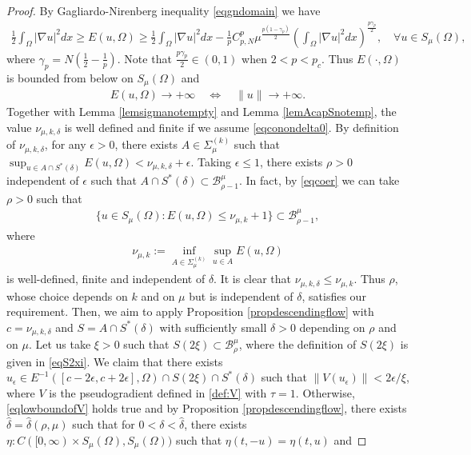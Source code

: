\documentclass[10pt,a4paper]{article}
\theoremstyle{definition} \theoremstyle{remark}
\numberwithin{equation}{section}
\newcommand{\B}{\mathcal{B}}
\newcommand{\ga}{\gamma}
\newcommand{\ep}{\epsilon}
\begin{document}
\begin{proof}
	By Gagliardo-Nirenberg inequality \eqref{eqgndomain} we have
	\begin{align} \label{eq5.3}
		\frac12 \int_\Omega |\nabla u|^2dx \ge E(u,\Omega) \geq \frac12 \int_\Omega |\nabla u|^2dx - \frac1p C_{p,N}^p \mu^{\frac{p(1-\ga_p)}{2}}\left( \int_\Omega |\nabla u|^2dx\right) ^{\frac{p\ga_p}{2}}, \quad \forall u \in S_\mu(\Omega),
	\end{align}
    where $\ga_p = N(\frac12-\frac1p)$. Note that $\frac{p\ga_p}{2} \in (0,1)$ when $2 < p < p_c$. Thus $E(\cdot, \Omega)$ is bounded from below on $S_\mu(\Omega)$ and
    \begin{align} \label{eqcoer}
    	E(u,\Omega) \to +\infty \quad \Leftrightarrow \quad \|u\| \to +\infty.
    \end{align}
    Together with Lemma \ref{lemsigmanotempty} and Lemma \ref{lemAcapSnotemp}, the value $\nu_{\mu,k,\delta}$ is well defined and finite if we assume \eqref{eqconondelta0}. By definition of $\nu_{\mu,k,\delta}$, for any $\ep > 0$, there exists $A \in \Sigma_{\mu}^{(k)}$ such that $\sup_{u \in A \cap S^*(\delta)}E(u,\Omega) < \nu_{\mu,k,\delta} + \ep$. Taking $\ep \leq 1$, there exists $\rho > 0$ independent of $\ep$ such that $A \cap S^*(\delta) \subset \B_{\rho-1}^\mu$. In fact, by \eqref{eqcoer} we can take $\rho > 0$ such that
    \begin{align*}
    	\bigl\{u \in S_\mu(\Omega) : E(u,\Omega) \leq \nu_{\mu,k} + 1\bigr\} \subset \B_{\rho-1}^\mu,
    \end{align*}
    where
    \begin{align}
    	\nu_{\mu,k} := \inf_{A \in \Sigma_{\mu}^{(k)}}\sup_{u \in A}E(u,\Omega)
    \end{align}
    is well-defined, finite and independent of $\delta$. It is clear that $\nu_{\mu,k,\delta} \leq \nu_{\mu,k}$. Thus $\rho$, whose choice depends on $k$ and on $\mu$ but is independent of $\delta$, satisfies our requirement. Then, we aim to apply Proposition \ref{propdescendingflow} with $c  = \nu_{\mu,k,\delta}$ and $S = A \cap S^*(\delta)$ with sufficiently small $\delta > 0$ depending on $\rho$ and on $\mu$. Let us take $\xi > 0$ such that $S(2\xi) \subset \B_{\rho}^\mu$, where the definition of $S(2\xi)$ is given in \eqref{eqS2xi}. We claim that there exists $u_\ep \in E^{-1}([c-2\epsilon,c+2\epsilon],\Omega) \cap S(2\xi) \cap S^*(\delta)$ such that $\|V(u_\ep)\| < 2\epsilon /\xi$, where $V$ is the pseudogradient defined in \eqref{def:V} with $\tau = 1$. Otherwise, \eqref{eqlowboundofV} holds true and by Proposition \ref{propdescendingflow}, there exists $\hat \delta = \hat \delta (\rho,\mu)$ such that for $0 < \delta < \hat \delta$, there exists $\eta: C([0,\infty) \times S_\mu(\Omega), S_\mu(\Omega))$ such that $\eta(t,-u) = \eta(t,u)$ and

\end{proof}
\end{document}
